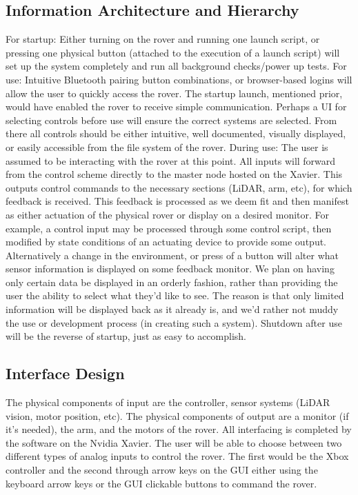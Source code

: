 \documentclass[a4paper, 10pt]{article}
\begin{document}
	\subsection{Information Architecture and Hierarchy}
	For startup: Either turning on the rover and running one launch script, or pressing one physical button (attached to the execution of a launch script) will set up the system completely and run all background checks/power up tests. 
For use: Intuitive Bluetooth pairing button combinations, or browser-based logins will allow the user to quickly access the rover. The startup launch, mentioned prior, would have enabled the rover to receive simple communication. Perhaps a UI for selecting controls before use will ensure the correct systems are selected. From there all controls should be either intuitive, well documented, visually displayed, or easily accessible from the file system of the rover. 
During use: The user is assumed to be interacting with the rover at this point. All inputs will forward from the control scheme directly to the master node hosted on the Xavier. This outputs control commands to the necessary sections (LiDAR, arm, etc), for which feedback is received. This feedback is processed as we deem fit and then manifest as either actuation of the physical rover or display on a desired monitor. For example, a control input may be processed through some control script, then modified by state conditions of an actuating device to provide some output. Alternatively a change in the environment, or press of a button will alter what sensor information is displayed on some feedback monitor. We plan on having only certain data be displayed in an orderly fashion, rather than providing the user the ability to select what they'd like to see. The reason is that only limited information will be displayed back as it already is, and we'd rather not muddy the use or development process (in creating such a system). Shutdown after use will be the reverse of startup, just as easy to accomplish.

	\subsection{Interface Design}
	The physical components of input are the controller, sensor systems (LiDAR vision, motor position, etc). The physical components of output are a monitor (if it’s needed), the arm, and the motors of the rover. All interfacing is completed by the software on the Nvidia Xavier. 
The user will be able to choose between two different types of analog inputs to control the rover. The first would be the Xbox controller and the second through arrow keys on the GUI either using the keyboard arrow keys or the GUI clickable buttons to command the rover.
\end{document}

